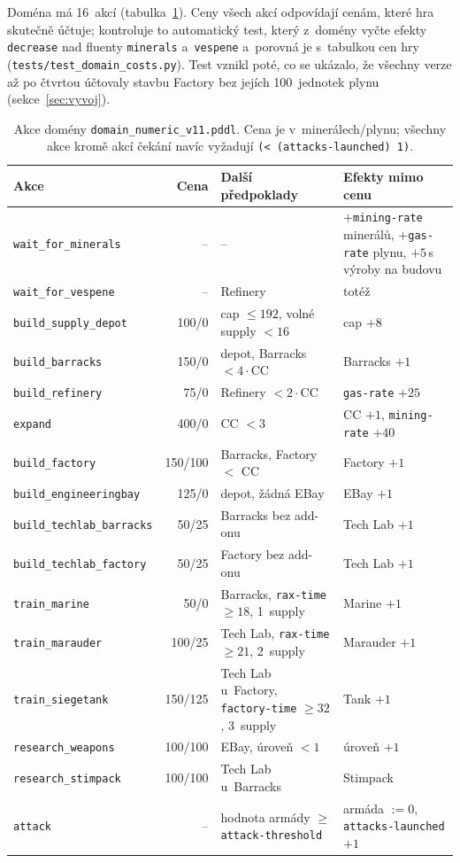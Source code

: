 Doména má 16~akcí (tabulka~\ref{tab:akce}). Ceny všech akcí odpovídají cenám, které hra skutečně účtuje; kontroluje to automatický test, který z~domény vyčte efekty \texttt{decrease} nad fluenty \texttt{minerals} a~\texttt{vespene} a~porovná je s~tabulkou cen hry (\texttt{tests/test\_domain\_costs.py}). Test vznikl poté, co se ukázalo, že všechny verze až po čtvrtou účtovaly stavbu Factory bez jejích 100~jednotek plynu (sekce~\ref{sec:vyvoj}).

\begin{table}[ht]
	\centering
	\caption[Akce domény \texttt{domain\_numeric\_v11.pddl}.]{Akce domény \texttt{domain\_numeric\_v11.pddl}. Cena je v~minerálech/plynu; všechny akce kromě akcí čekání navíc vyžadují \texttt{(< (attacks-launched) 1)}.}
	\label{tab:akce}
	\footnotesize
	\begin{tabularx}{\textwidth}{@{} l r >{\raggedright\arraybackslash}X >{\raggedright\arraybackslash}X @{}}
		\toprule
		\textbf{Akce} & \textbf{Cena} & \textbf{Další předpoklady} & \textbf{Efekty mimo cenu} \\
		\midrule
		\texttt{wait\_for\_minerals} & -- & -- & $+$\texttt{mining-rate} minerálů, $+$\texttt{gas-rate} plynu, $+5$\,s výroby na budovu \\
		\texttt{wait\_for\_vespene} & -- & Refinery & totéž \\
		\texttt{build\_supply\_depot} & 100/0 & cap $\le 192$, volné supply $< 16$ & cap $+8$ \\
		\texttt{build\_barracks} & 150/0 & depot, Barracks $< 4\cdot$CC & Barracks $+1$ \\
		\texttt{build\_refinery} & 75/0 & Refinery $< 2\cdot$CC & \texttt{gas-rate} $+25$ \\
		\texttt{expand} & 400/0 & CC $< 3$ & CC $+1$, \texttt{mining-rate} $+40$ \\
		\texttt{build\_factory} & 150/100 & Barracks, Factory $<$ CC & Factory $+1$ \\
		\texttt{build\_engineeringbay} & 125/0 & depot, žádná EBay & EBay $+1$ \\
		\texttt{build\_techlab\_barracks} & 50/25 & Barracks bez add-onu & Tech Lab $+1$ \\
		\texttt{build\_techlab\_factory} & 50/25 & Factory bez add-onu & Tech Lab $+1$ \\
		\texttt{train\_marine} & 50/0 & Barracks, \texttt{rax-time} $\ge 18$, 1~supply & Marine $+1$ \\
		\texttt{train\_marauder} & 100/25 & Tech Lab, \texttt{rax-time} $\ge 21$, 2~supply & Marauder $+1$ \\
		\texttt{train\_siegetank} & 150/125 & Tech Lab u~Factory, \texttt{factory-time} $\ge 32$, 3~supply & Tank $+1$ \\
		\texttt{research\_weapons} & 100/100 & EBay, úroveň $< 1$ & úroveň $+1$ \\
		\texttt{research\_stimpack} & 100/100 & Tech Lab u~Barracks & Stimpack \\
		\texttt{attack} & -- & hodnota armády $\ge$ \texttt{attack-threshold} & armáda $:= 0$, \texttt{attacks-launched} $+1$ \\
		\bottomrule
	\end{tabularx}
\end{table}


